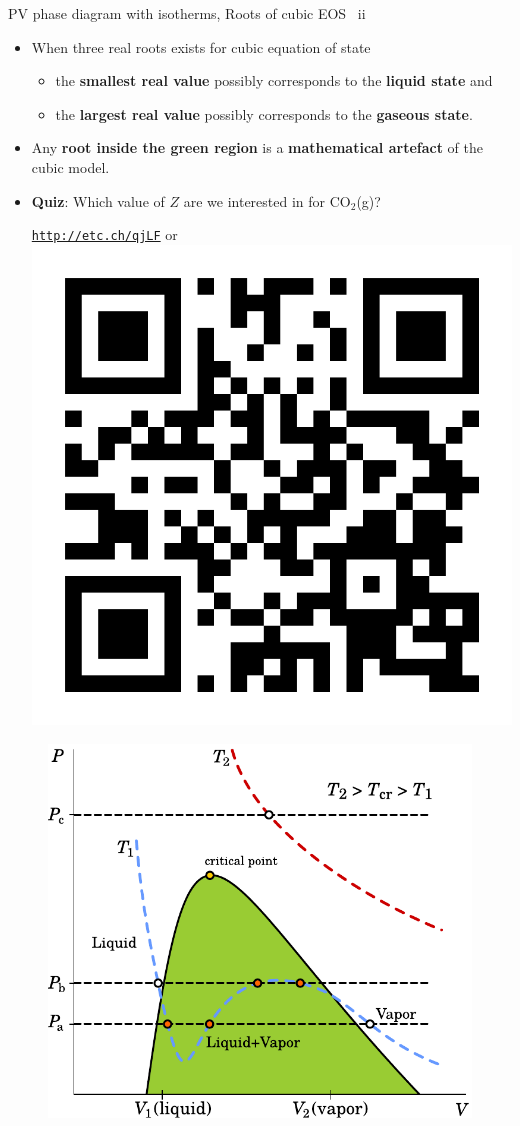 \begin{frame}{PV phase diagram with isotherms, Roots of cubic EOS \, ii}
\footnotesize
\lcol
\begin{itemize}[<+->]
\item When three real roots exists for cubic equation of state
\begin{itemize}
\item the \textbf{smallest real value} possibly corresponds to the \textbf{liquid state} and 
\item the \textbf{largest real value} possibly corresponds to the \textbf{gaseous state}.
\end{itemize}
\item Any \textbf{root inside the green region} is a \textbf{mathematical artefact} of the cubic model.
\item \alert{\textbf{Quiz}}: Which value of $Z$ are we interested
in for CO$_{2}$(g)?
\begin{center}
	\href{http://etc.ch/qjLF}{\textcolor{indigo(dye)}{\tt http://etc.ch/qjLF}} \quad or \quad 
	\includegraphics[height=0.18\columnwidth]{figures/activity-models/poll-ionic-strength.png}
\end{center} 
\end{itemize}
\rcol
\begin{figure}
\centering 
\includegraphics[width=1\textwidth]{figures/activity-models/phase-diagram-pv-cubic-eos-roots}

\end{figure}
\end{frame}
